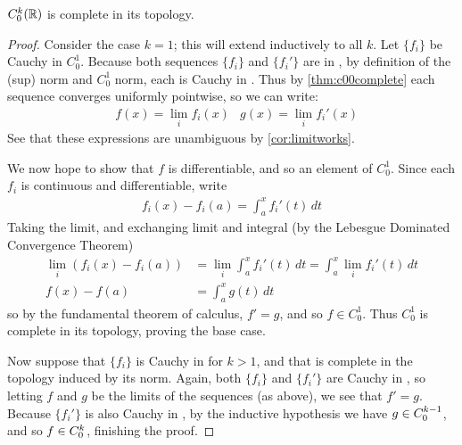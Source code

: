       \begin{thm}
        \label{thm:ck0complete}
        ${C^k_0}(\mathbb{R})$ is complete in its topology.
      \end{thm}
      \begin{proof}
        Consider the case $k=1$; this will extend inductively to all $k$.
        Let $\{f_i\}$ be Cauchy in $C^1_0$.
        Because both sequences $\{f_i\}$ and $\{f_i'\}$ are in \Coo, by definition of the \Coo (sup) norm and $C^1_0$ norm, each is Cauchy in \Coo.
        Thus by \cref{thm:c00complete} each sequence converges uniformly pointwise, so we can write:
        \begin{align*}
          &f(x)=\lim_i f_i(x) &g(x)=\lim_i f_i'(x)
        \end{align*}
        See that these expressions are unambiguous by \cref{cor:limitworks}.

        We now hope to show that $f$ is differentiable, and so an element of $C^1_0$.
        Since each $f_i$ is continuous and differentiable, write
        \begin{align*}
          f_i(x)-f_i(a) = \int_a^x f_i'(t)\,dt
        \end{align*}
        Taking the limit, and exchanging limit and integral (by the Lebesgue Dominated Convergence Theorem)
        \begin{align*}
          \lim_i \left( f_i(x)-f_i(a) \right) &= \lim_i\int_a^x f_i'(t)\,dt
          = \int_a^x\lim_if_i'(t)\,dt
          \\ f(x)-f(a) &= \int_a^x g(t)\,dt
        \end{align*}
        so by the fundamental theorem of calculus, $f'=g$, and so $f\in C^1_0$.
        Thus $C^1_0$ is complete in its topology, proving the base case.

        Now suppose that $\{f_i\}$ is Cauchy in \Cko for $k>1$, and that \Ckmo is complete in the topology induced by its norm.
        Again, both $\{f_i\}$ and $\{f_i'\}$ are Cauchy in \Coo, so letting $f$ and $g$ be the limits of the sequences (as above), we see that $f'=g$.
        Because $\{f_i'\}$ is also Cauchy in \Ckmo, by the inductive hypothesis we have $g\in{C^{k-1}_0}$, and so $f\in{C^k_0}$, finishing the proof.
      \end{proof}

